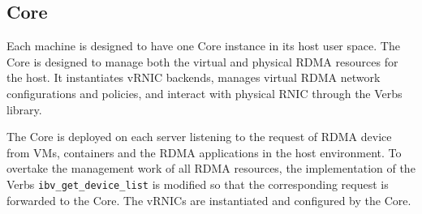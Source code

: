 \subsection{\sys Core}

Each machine is designed to have one \sys Core instance in its host user space. The \sys Core is designed to manage both the virtual and physical RDMA resources for the host. It instantiates vRNIC backends, manages virtual RDMA network configurations and policies, and interact with physical RNIC through the Verbs library.





The \sys Core is deployed on each server listening to the request of RDMA device from VMs, containers and the RDMA applications in the host environment. To overtake the management work of all RDMA resources, the implementation of the Verbs \texttt{ibv\_get\_device\_list} is modified so that the corresponding request is forwarded to the \sys Core. The vRNICs are instantiated and configured by the \sys Core.


